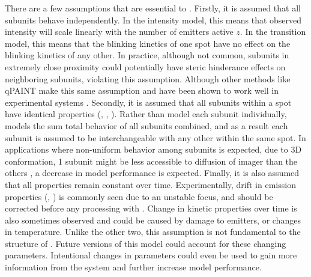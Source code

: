 There are a few assumptions that are essential to \ours.
    Firstly, it is assumed that all subunits behave independently.
    In the intensity model, this means that observed intensity will scale linearly with the number of emitters active $z$.
    In the transition model, this means that the blinking kinetics of one spot have no effect on the blinking kinetics of any other.
    In practice, although not common, subunits in extremely close proximity could potentially 
    have steric hinderance effects on neighboring subunits, violating this assumption.
    Although other methods like qPAINT make this same assumption and have been shown to work well in experimental systems \cite{}. 
    Secondly, it is assumed that all subunits within a spot have identical properties (\pon, \poff, \re).
    Rather than model each subunit individually, \ours models the sum total behavior of all subunits combined, 
    and as a result each subunit is assumed to be interchangeable with any other within the same spot.
    In applications where non-uniform behavior among subunits is expected, \eg due to 3D conformation, 
    1 subunit might be less accessible to diffusion of imager than the others \cite{civitci_2020}, a decrease in model performance is expected.
    Finally, it is also assumed that all properties remain constant over time. 
    Experimentally, drift in emission properties (\re, \rb) is commonly seen due to an unstable focus, and should be corrected before any processing with \ours.
    Change in kinetic properties over time is also sometimes observed and could be caused by damage to emitters, or changes in temperature. 
    Unlike the other two, this assumption is not fundamental to the structure of \ours. 
    Future versions of this model could account for these changing parameters.
    Intentional changes in parameters could even be used to gain more information from the system and further increase model performance. 
    


